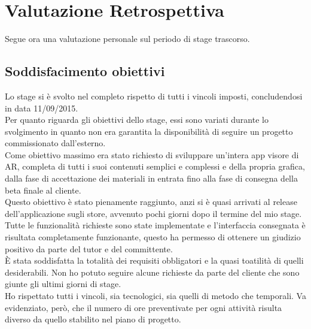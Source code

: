 \section{Valutazione Retrospettiva}
Segue ora una valutazione personale sul periodo di stage trascorso.
\subsection{Soddisfacimento obiettivi}
Lo stage si \`e svolto nel completo rispetto di tutti i vincoli imposti, concludendosi in data 11/09/2015. \\
Per quanto riguarda gli obiettivi dello stage, essi sono variati durante lo svolgimento in quanto non era garantita la disponibilit\`a di seguire un progetto commissionato dall'esterno.\\
Come obiettivo massimo era stato richiesto di sviluppare un’intera app visore di AR, completa di tutti i suoi contenuti semplici e complessi e della propria grafica, dalla fase di accettazione dei materiali in entrata fino alla fase di consegna della beta finale al cliente.\\
Questo obiettivo \`e stato pienamente raggiunto, anzi si \`e quasi arrivati al release dell'applicazione sugli store, avvenuto pochi giorni dopo il termine del mio stage.\\
Tutte le funzionalit\`a richieste sono state implementate e l’interfaccia consegnata \`e risultata completamente funzionante, questo ha permesso di ottenere un giudizio positivo da parte del tutor e del committente.\\
\`E stata soddisfatta la totalit\`a dei requisiti obbligatori e la quasi toatilit\`a di quelli desiderabili. Non ho potuto seguire alcune richieste da parte del cliente che sono giunte gli ultimi giorni di stage.\\
Ho rispettato tutti i vincoli, sia tecnologici, sia quelli di metodo che temporali. Va evidenziato, per\`o, che il numero di ore preventivate per ogni attivit\`a risulta diverso da quello stabilito nel piano di progetto.\\
\newpage
